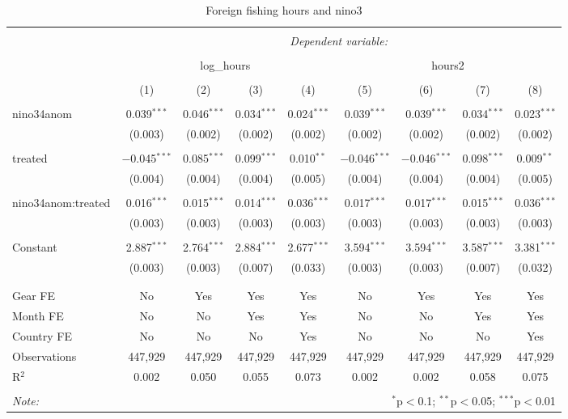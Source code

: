 
\begin{table}[!htbp] \centering 
  \caption{\label{tab:ff_reg}Foreign fishing hours and nino3} 
  \label{} 
\small 
\begin{tabular}{@{\extracolsep{5pt}}lcccccccc} 
\\[-1.8ex]\hline 
\hline \\[-1.8ex] 
 & \multicolumn{8}{c}{\textit{Dependent variable:}} \\ 
\cline{2-9} 
\\[-1.8ex] & \multicolumn{4}{c}{log\_hours} & \multicolumn{4}{c}{hours2} \\ 
\\[-1.8ex] & (1) & (2) & (3) & (4) & (5) & (6) & (7) & (8)\\ 
\hline \\[-1.8ex] 
 nino34anom & 0.039$^{***}$ & 0.046$^{***}$ & 0.034$^{***}$ & 0.024$^{***}$ & 0.039$^{***}$ & 0.039$^{***}$ & 0.034$^{***}$ & 0.023$^{***}$ \\ 
  & (0.003) & (0.002) & (0.002) & (0.002) & (0.002) & (0.002) & (0.002) & (0.002) \\ 
  & & & & & & & & \\ 
 treated & $-$0.045$^{***}$ & 0.085$^{***}$ & 0.099$^{***}$ & 0.010$^{**}$ & $-$0.046$^{***}$ & $-$0.046$^{***}$ & 0.098$^{***}$ & 0.009$^{**}$ \\ 
  & (0.004) & (0.004) & (0.004) & (0.005) & (0.004) & (0.004) & (0.004) & (0.005) \\ 
  & & & & & & & & \\ 
 nino34anom:treated & 0.016$^{***}$ & 0.015$^{***}$ & 0.014$^{***}$ & 0.036$^{***}$ & 0.017$^{***}$ & 0.017$^{***}$ & 0.015$^{***}$ & 0.036$^{***}$ \\ 
  & (0.003) & (0.003) & (0.003) & (0.003) & (0.003) & (0.003) & (0.003) & (0.003) \\ 
  & & & & & & & & \\ 
 Constant & 2.887$^{***}$ & 2.764$^{***}$ & 2.884$^{***}$ & 2.677$^{***}$ & 3.594$^{***}$ & 3.594$^{***}$ & 3.587$^{***}$ & 3.381$^{***}$ \\ 
  & (0.003) & (0.003) & (0.007) & (0.033) & (0.003) & (0.003) & (0.007) & (0.032) \\ 
  & & & & & & & & \\ 
\hline \\[-1.8ex] 
Gear FE & No & Yes & Yes & Yes & No & Yes & Yes & Yes \\ 
Month FE & No & No & Yes & Yes & No & No & Yes & Yes \\ 
Country FE & No & No & No & Yes & No & No & No & Yes \\ 
Observations & 447,929 & 447,929 & 447,929 & 447,929 & 447,929 & 447,929 & 447,929 & 447,929 \\ 
R$^{2}$ & 0.002 & 0.050 & 0.055 & 0.073 & 0.002 & 0.002 & 0.058 & 0.075 \\ 
\hline 
\hline \\[-1.8ex] 
\textit{Note:}  & \multicolumn{8}{r}{$^{*}$p$<$0.1; $^{**}$p$<$0.05; $^{***}$p$<$0.01} \\ 
\end{tabular} 
\end{table} 

